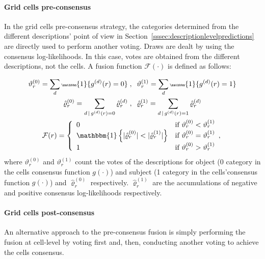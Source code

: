 \documentclass[10pt,twocolumn,letterpaper]{article}
\begin{document}
\paragraph{Grid cells pre-consensus}

In the grid cells pre-consensus strategy, the categories determined from the different descriptions' point of view in Section~\ref{sssec:descriptionlevelpredictions} are directly used to perform another voting. Draws are dealt by using the consensus log-likelihoods. In this case, votes are obtained from the different descriptions, not the cells. A fusion function $\mathcal{F}(\cdot)$ is defined as follows:

\begin{gather*}\tiny
\vartheta_r^{(0)} = \sum_{d} \mathbbm{1}\{ g^{(d)}(r) = 0 \} \; , \;\; \vartheta_r^{(1)} = \sum_{d} \mathbbm{1}\{ g^{(d)}(r) = 1 \} \\
\hat{\varrho}_r^{(0)} = \sum_{d \,|\, g^{(d)}(r) = 0} \hat{\varrho}_r^{(d)} \; , \;\; \hat{\varrho}_r^{(1)}  =\sum_{d \,|\, g^{(d)}(r) = 1} \hat{\varrho}_r^{(d)} \\
\mathcal{F}(r) =
\left\{
	\begin{array}{ll}
		0  &  \mbox{if } \vartheta_r^{(0)} < \vartheta_r^{(1)}   \\
		\mathbbm{1}\left\{ | \hat{\varrho}_r^{(0)} | < | \hat{\varrho}_r^{(1)} | \right\} &  \mbox{if } \vartheta_r^{(0)} = \vartheta_r^{(1)}   \\
		1 &  \mbox{if } \vartheta_r^{(0)} > \vartheta_r^{(1)}   \\
	\end{array},
\right.
\end{gather*}
where $\vartheta_r^{(0)}$ and $\vartheta_r^{(1)}$ count the votes of the descriptions for object (0 category in the cells consensus function $g(\cdot)$) and subject (1 category in the cells'consensus function $g(\cdot)$) and $\hat{\varrho}_r^{(0)}$ respectively. $\hat{\varrho}_r^{(1)}$ are the accumulations of negative and positive consensus log-likelihoods respectively.

\paragraph{Grid cells post-consensus}

An alternative approach to the pre-consensus fusion is simply performing the fusion at cell-level by voting first and, then, conducting another voting to achieve the cells consensus.
\end{document}
